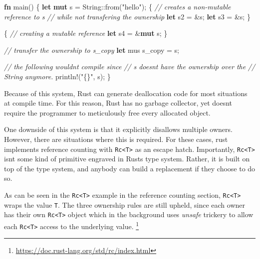\documentclass[
]{article}
\newenvironment{Shaded}{}{}
\newcommand{\CommentTok}[1]{\textcolor[rgb]{0.38,0.63,0.69}{\textit{#1}}}
\newcommand{\DataTypeTok}[1]{\textcolor[rgb]{0.56,0.13,0.00}{#1}}
\newcommand{\KeywordTok}[1]{\textcolor[rgb]{0.00,0.44,0.13}{\textbf{#1}}}
\newcommand{\NormalTok}[1]{#1}
\newcommand{\OperatorTok}[1]{\textcolor[rgb]{0.40,0.40,0.40}{#1}}
\newcommand{\PreprocessorTok}[1]{\textcolor[rgb]{0.74,0.48,0.00}{#1}}
\newcommand{\StringTok}[1]{\textcolor[rgb]{0.25,0.44,0.63}{#1}}
\begin{document}
\begin{Shaded}
\begin{Highlighting}[]
\KeywordTok{fn}\NormalTok{ main() }\OperatorTok{\{}
    \KeywordTok{let} \KeywordTok{mut}\NormalTok{ s }\OperatorTok{=} \DataTypeTok{String}\PreprocessorTok{::}\NormalTok{from(}\StringTok{"hello"}\NormalTok{)}\OperatorTok{;}
    \OperatorTok{\{}
        \CommentTok{// creates a non{-}mutable reference to s}
        \CommentTok{// while not transfering the ownership}
        \KeywordTok{let}\NormalTok{ s2 }\OperatorTok{=} \OperatorTok{\&}\NormalTok{s}\OperatorTok{;}
        \KeywordTok{let}\NormalTok{ s3 }\OperatorTok{=} \OperatorTok{\&}\NormalTok{s}\OperatorTok{;}
    \OperatorTok{\}}

    \OperatorTok{\{}
        \CommentTok{// creating a mutable reference}
        \KeywordTok{let}\NormalTok{ s4 }\OperatorTok{=} \OperatorTok{\&}\KeywordTok{mut}\NormalTok{ s}\OperatorTok{;}
    \OperatorTok{\}}
   
    \CommentTok{// transfer the ownership to s\_copy}
    \KeywordTok{let}\NormalTok{ mus s\_copy }\OperatorTok{=}\NormalTok{ s}\OperatorTok{;}
    
    \CommentTok{// the following wouldn\textquotesingle{}t compile since }
    \CommentTok{// s doesn\textquotesingle{}t have the ownership over the}
    \CommentTok{// String anymore.}
    \PreprocessorTok{println!}\NormalTok{(}\StringTok{"\{\}"}\OperatorTok{,}\NormalTok{ s)}\OperatorTok{;} 
\OperatorTok{\}}
\end{Highlighting}
\end{Shaded}

Because of this system, Rust can generate deallocation code for most
situations at compile time. For this reason, Rust has no garbage
collector, yet doesn\textquotesingle t require the programmer to
meticulously free every allocated object.

One downside of this system is that it explicitly disallows multiple
owners. However, there are situations where this is required. For these
cases, rust implements reference counting with
\texttt{Rc\textless{}T\textgreater{}} as an escape hatch. Importantly,
\texttt{Rc\textless{}T\textgreater{}} isn\textquotesingle t some kind of
primitive engraved in Rust\textquotesingle s type system. Rather, it is
built on top of the type system, and anybody can build a replacement if
they choose to do so.

As can be seen in the \texttt{Rc\textless{}T\textgreater{}} example in
the reference counting section, \texttt{Rc\textless{}T\textgreater{}}
wraps the value \texttt{T}. The three ownership rules are still upheld,
since each owner has their own \texttt{Rc\textless{}T\textgreater{}}
object which in the background uses \emph{unsafe} trickery to allow each
\texttt{Rc\textless{}T\textgreater{}} access to the underlying value.
\footnote{\url{https://doc.rust-lang.org/std/rc/index.html}}
\end{document}
